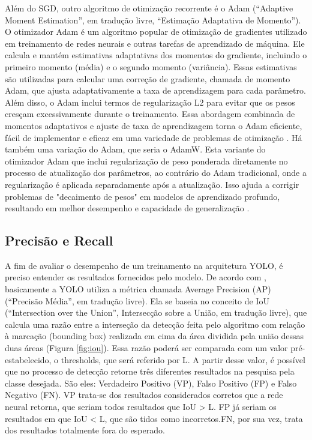 Além do SGD, outro algoritmo de otimização recorrente é o Adam (“Adaptive Moment Estimation”, em tradução livre, “Estimação Adaptativa de Momento”). O otimizador Adam é um algoritmo popular de otimização de gradientes utilizado em treinamento de redes neurais e outras tarefas de aprendizado de máquina. Ele calcula e mantém estimativas adaptativas dos momentos do gradiente, incluindo o primeiro momento (média) e o segundo momento (variância). Essas estimativas são utilizadas para calcular uma correção de gradiente, chamada de momento Adam, que ajusta adaptativamente a taxa de aprendizagem para cada parâmetro. Além disso, o Adam inclui termos de regularização L2 para evitar que os pesos cresçam excessivamente durante o treinamento. Essa abordagem combinada de momentos adaptativos e ajuste de taxa de aprendizagem torna o Adam eficiente, fácil de implementar e eficaz em uma variedade de problemas de otimização \cite{kingma2014adam}.
Há também uma variação do Adam, que seria o AdamW. Esta variante do otimizador Adam que inclui regularização de peso ponderada diretamente no processo de atualização dos parâmetros, ao contrário do Adam tradicional, onde a regularização é aplicada separadamente após a atualização. Isso ajuda a corrigir problemas de "decaimento de pesos" em modelos de aprendizado profundo, resultando em melhor desempenho e capacidade de generalização \cite{zhou2024towards}.

\subsection{Precisão e Recall}
\label{sec:precisaorecall}

A fim de avaliar o desempenho de um treinamento na arquitetura YOLO, é preciso entender os resultados fornecidos pelo modelo. De acordo com \cite{padilla2020survey}, basicamente a YOLO utiliza a métrica chamada Average Precision (AP) (“Precisão Média”, em tradução livre). Ela se baseia no conceito de IoU (“Intersection over the Union”, Intersecção sobre a União, em tradução livre), que calcula uma razão entre a interseção da detecção feita pelo algoritmo com relação à marcação (bounding box) realizada em cima da área dividida pela união dessas duas áreas (Figura \ref{fig:iou}). Essa razão poderá ser comparada com um valor pré-estabelecido, o thresholds, que será referido por L. A partir desse valor, é possível que no processo de detecção retorne três diferentes resultados na pesquisa pela classe desejada. São eles: Verdadeiro Positivo (VP), Falso Positivo (FP) e Falso Negativo (FN). VP trata-se dos resultados considerados corretos que a rede neural retorna, que seriam todos resultados que IoU > L. FP já seriam os resultados em que IoU < L, que são tidos como incorretos.FN, por sua vez, trata dos resultados totalmente fora do esperado.

